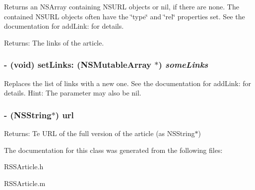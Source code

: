 Returns an NSArray containing NSURL objects or nil, if there are none. The contained NSURL objects often have the \char`\"{}type\char`\"{} and \char`\"{}rel\char`\"{} properties set. See the documentation for add\-Link: for details.

\begin{Desc}
\item[Returns:]The links of the article. \end{Desc}
\subsubsection{\setlength{\rightskip}{0pt plus 5cm}- (void) set\-Links: (NSMutable\-Array $\ast$) {\em some\-Links}}\label{interfaceRSSArticle_ca5aede67d6dab975c7457e3af06fc6c}


Replaces the list of links with a new one. See the documentation for add\-Link: for details. Hint: The parameter may also be nil. 
\subsubsection{\setlength{\rightskip}{0pt plus 5cm}- (NSString$\ast$) url }\label{interfaceRSSArticle_e6488ed33911d3717c256058d902c477}


\begin{Desc}
\item[Returns:]Te URL of the full version of the article (as NSString$\ast$) \end{Desc}


The documentation for this class was generated from the following files:\begin{CompactItemize}
\item 
RSSArticle.h\item 
RSSArticle.m\end{CompactItemize}
